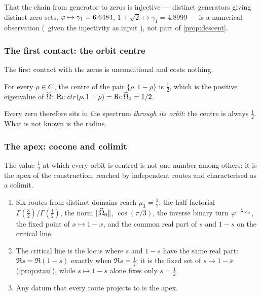 \begin{remark}\label{rmk:descent-info}
That the chain from generator to zeros is injective --- distinct generators giving
distinct zero sets, $\varphi\mapsto\gamma_1=6.6484$, $1+\sqrt2\mapsto\gamma_1=4.8999$ ---
is a numerical observation (\ given the
injectivity as input ), not part of \cref{prop:descent}.
\end{remark}

\subsubsection{The first contact: the orbit centre}\label{ssec:orbit-centre}

The first contact with the zeros is unconditional and costs nothing.

\begin{proposition}\label{prop:orbit-embedding}
For every $\rho\in C$, the centre of the pair $\{\rho,1-\rho\}$ is $\tfrac12$,
which is the positive eigenvalue of $\widehat{\Omega}$:
$\operatorname{Re}\,ctr(\rho,1-\rho)=\operatorname{Re}\widehat{\Omega}_0=1/2$.
%
\end{proposition}

Every zero therefore sits in the spectrum \emph{through its orbit}: the centre is
always $\tfrac12$.  What is not known is the radius.

\subsubsection{The apex: cocone and colimit}\label{ssec:apex}

The value $\tfrac12$ at which every orbit is centred is not one number among others:
it is the apex of the construction, reached by independent routes and characterised
as a colimit.

\begin{proposition}\label{prop:cocone}
\begin{enumerate}[label=\textup{(\roman*)}]
  \item Six routes from distinct domains reach $\mu_3=\tfrac12$: the half-factorial
    $\Gamma(\tfrac32)/\Gamma(\tfrac12)$, the norm $\|\widehat{\Omega}_0\|$, $\cos(\pi/3)$, the
    inverse binary turn $\varphi^{-\lambda_{log}}$, the fixed point of $x\mapsto1-x$, and the
    common real part of $s$ and $1-s$ on the critical line.
  \item The critical line is the locus where $s$ and $1-s$ have the same real part:
    $\Re s=\Re(1-s)$ exactly when $\Re s=\tfrac12$; it is the fixed set of $s\mapsto1-\bar s$
    (\cref{prop:stau}), while $s\mapsto1-s$ alone fixes only $s=\tfrac12$.
  \item Any datum that every route projects to is the apex.
\end{enumerate}
%
\end{proposition}

